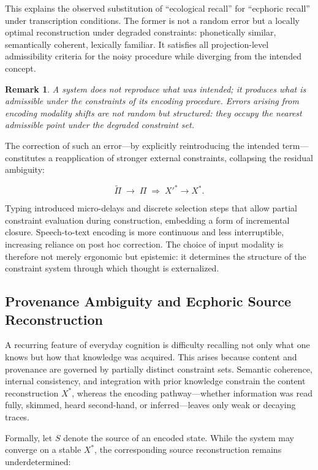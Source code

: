 \documentclass[12pt, letterpaper]{article}
\theoremstyle{flyxion}
\newtheorem*{remark}{Remark}
\begin{document}
This explains the observed substitution of ``ecological recall'' for ``ecphoric recall'' under transcription conditions. The former is not a random error but a locally optimal reconstruction under degraded constraints: phonetically similar, semantically coherent, lexically familiar. It satisfies all projection-level admissibility criteria for the noisy procedure while diverging from the intended concept.

\begin{remark}
A system does not reproduce what was intended; it produces what is admissible under the constraints of its encoding procedure. Errors arising from encoding modality shifts are not random but structured: they occupy the nearest admissible point under the degraded constraint set.
\end{remark}

The correction of such an error---by explicitly reintroducing the intended term---constitutes a reapplication of stronger external constraints, collapsing the residual ambiguity:

\begin{equation}
\tilde{\Pi} \;\to\; \Pi \;\Rightarrow\; X'^* \to X^*.
\end{equation}

Typing introduced micro-delays and discrete selection steps that allow partial constraint evaluation during construction, embedding a form of incremental closure. Speech-to-text encoding is more continuous and less interruptible, increasing reliance on post hoc correction. The choice of input modality is therefore not merely ergonomic but epistemic: it determines the structure of the constraint system through which thought is externalized.

\subsection{Provenance Ambiguity and Ecphoric Source Reconstruction}

A recurring feature of everyday cognition is difficulty recalling not only what one knows but how that knowledge was acquired. This arises because content and provenance are governed by partially distinct constraint sets. Semantic coherence, internal consistency, and integration with prior knowledge constrain the content reconstruction $X^*$, whereas the encoding pathway---whether information was read fully, skimmed, heard second-hand, or inferred---leaves only weak or decaying traces.

Formally, let $S$ denote the source of an encoded state. While the system may converge on a stable $X^*$, the corresponding source reconstruction remains underdetermined:
\end{document}

